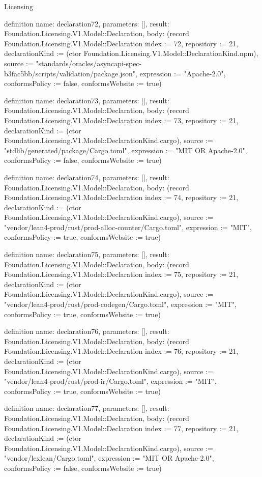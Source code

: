 \begin{lexlean}{Licensing}
\begin{semanticmodule}
definition{
  name: declaration72,
  parameters: [],
  result: Foundation.Licensing.V1.Model::Declaration,
  body: (record Foundation.Licensing.V1.Model::Declaration {index := 72, repository := 21, declarationKind := (ctor Foundation.Licensing.V1.Model::DeclarationKind.npm), source := "standards/oracles/asyncapi-spec-b3fac5bb/scripts/validation/package.json", expression := "Apache-2.0", conformsPolicy := false, conformsWebsite := true})
}

definition{
  name: declaration73,
  parameters: [],
  result: Foundation.Licensing.V1.Model::Declaration,
  body: (record Foundation.Licensing.V1.Model::Declaration {index := 73, repository := 21, declarationKind := (ctor Foundation.Licensing.V1.Model::DeclarationKind.cargo), source := "stdlib/generated/package/Cargo.toml", expression := "MIT OR Apache-2.0", conformsPolicy := false, conformsWebsite := true})
}

definition{
  name: declaration74,
  parameters: [],
  result: Foundation.Licensing.V1.Model::Declaration,
  body: (record Foundation.Licensing.V1.Model::Declaration {index := 74, repository := 21, declarationKind := (ctor Foundation.Licensing.V1.Model::DeclarationKind.cargo), source := "vendor/lean4-prod/rust/prod-alloc-counter/Cargo.toml", expression := "MIT", conformsPolicy := true, conformsWebsite := true})
}

definition{
  name: declaration75,
  parameters: [],
  result: Foundation.Licensing.V1.Model::Declaration,
  body: (record Foundation.Licensing.V1.Model::Declaration {index := 75, repository := 21, declarationKind := (ctor Foundation.Licensing.V1.Model::DeclarationKind.cargo), source := "vendor/lean4-prod/rust/prod-codegen/Cargo.toml", expression := "MIT", conformsPolicy := true, conformsWebsite := true})
}

definition{
  name: declaration76,
  parameters: [],
  result: Foundation.Licensing.V1.Model::Declaration,
  body: (record Foundation.Licensing.V1.Model::Declaration {index := 76, repository := 21, declarationKind := (ctor Foundation.Licensing.V1.Model::DeclarationKind.cargo), source := "vendor/lean4-prod/rust/prod-ir/Cargo.toml", expression := "MIT", conformsPolicy := true, conformsWebsite := true})
}

definition{
  name: declaration77,
  parameters: [],
  result: Foundation.Licensing.V1.Model::Declaration,
  body: (record Foundation.Licensing.V1.Model::Declaration {index := 77, repository := 21, declarationKind := (ctor Foundation.Licensing.V1.Model::DeclarationKind.cargo), source := "vendor/lexlean/Cargo.toml", expression := "MIT OR Apache-2.0", conformsPolicy := false, conformsWebsite := true})
}


\end{semanticmodule}
\end{lexlean}
